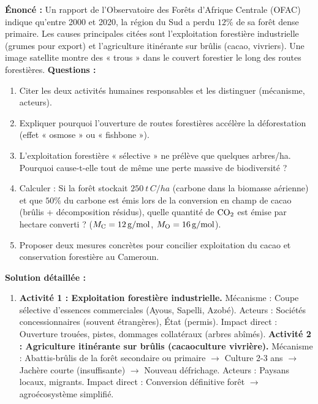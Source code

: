 \documentclass[11pt]{article}
\begin{document}
\begin{exoresolu}
    \textbf{Énoncé :} Un rapport de l'Observatoire des Forêts d'Afrique Centrale (OFAC) indique qu'entre 2000 et 2020, la région du Sud a perdu $12\%$ de sa forêt dense primaire. Les causes principales citées sont l'exploitation forestière industrielle (grumes pour export) et l'agriculture itinérante sur brûlis (cacao, vivriers). Une image satellite montre des « trous » dans le couvert forestier le long des routes forestières.
    \textbf{Questions :}
    \begin{enumerate}
        \item Citer les deux activités humaines responsables et les distinguer (mécanisme, acteurs).
        \item Expliquer pourquoi l'ouverture de routes forestières accélère la déforestation (effet « osmose » ou « fishbone »).
        \item L'exploitation forestière « sélective » ne prélève que quelques arbres/ha. Pourquoi cause-t-elle tout de même une perte massive de biodiversité ?
        \item Calculer : Si la forêt stockait $\SI{250}{t\,C/ha}$ (carbone dans la biomasse aérienne) et que $50\%$ du carbone est émis lors de la conversion en champ de cacao (brûlis + décomposition résidus), quelle quantité de $\ce{CO2}$ est émise par hectare converti ? ($M_{\ce{C}}=\SI{12}{g/mol}$, $M_{\ce{O}}=\SI{16}{g/mol}$).
        \item Proposer deux mesures concrètes pour concilier exploitation du cacao et conservation forestière au Cameroun.
    \end{enumerate}
    \tcblower
    \textbf{Solution détaillée :}
    \begin{enumerate}
        \item \textbf{Activité 1 : Exploitation forestière industrielle.} Mécanisme : Coupe sélective d'essences commerciales (Ayous, Sapelli, Azobé). Acteurs : Sociétés concessionnaires (souvent étrangères), État (permis). Impact direct : Ouverture trouées, pistes, dommages collatéraux (arbres abîmés).
              \textbf{Activité 2 : Agriculture itinérante sur brûlis (cacaoculture vivrière).} Mécanisme : Abattis-brûlis de la forêt secondaire ou primaire $\rightarrow$ Culture 2-3 ans $\rightarrow$ Jachère courte (insuffisante) $\rightarrow$ Nouveau défrichage. Acteurs : Paysans locaux, migrants. Impact direct : Conversion définitive forêt $\rightarrow$ agroécosystème simplifié.

\end{enumerate}
\end{exoresolu}
\end{document}
